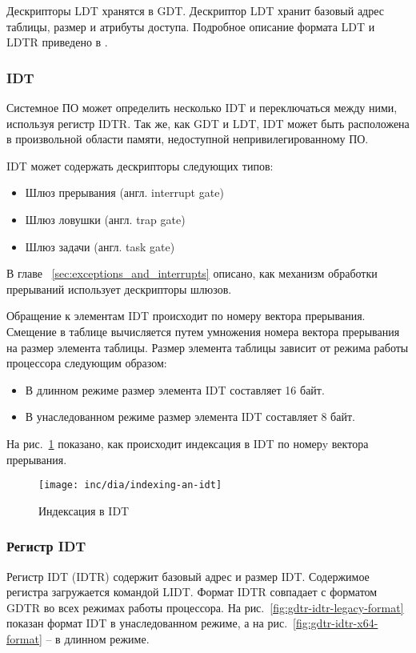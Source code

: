 Дескрипторы LDT хранятся в GDT. Дескриптор LDT хранит базовый адрес таблицы, размер и атрибуты доступа.
Подробное описание формата LDT и LDTR приведено в \cite{amd_pm_v2}.

\subsubsection*{IDT}
Системное ПО может определить несколько IDT и переключаться между ними, используя регистр IDTR. Так же, как
GDT и LDT, IDT может быть расположена в произвольной области памяти, недоступной непривилегированному ПО.

IDT может содержать дескрипторы следующих типов:
\begin{itemize}
	\item Шлюз прерывания (англ. interrupt gate)
	\item Шлюз ловушки (англ. trap gate)
	\item Шлюз задачи (англ. task gate)
\end{itemize}

В главе ~\ref{sec:exceptions_and_interrupts} описано,
как механизм обработки прерываний использует дескрипторы шлюзов.

Обращение к элементам IDT происходит по номеру вектора прерывания. Смещение в таблице вычисляется путем
умножения номера вектора прерывания на размер элемента таблицы. Размер элемента таблицы зависит от
режима работы процессора следующим образом:
\begin{itemize}
\item В длинном режиме размер элемента IDT составляет 16 байт.
\item В унаследованном режиме размер элемента IDT составляет 8 байт.
\end{itemize}

На рис.~\ref{fig:indexing-an-idt} показано, как происходит индексация в IDT по номерy вектора прерывания.

\begin{figure}[ht!]
  \centering
  \texttt{[image: inc/dia/indexing-an-idt]}
  \caption{Индексация в IDT}
  \label{fig:indexing-an-idt}
\end{figure}


\subsubsection*{Регистр IDT}
Регистр IDT (IDTR) содержит базовый адрес и размер IDT.
Содержимое регистра загружается командой LIDT. Формат IDTR совпадает с форматом GDTR во
всех режимах работы процессора. На рис.~\ref{fig:gdtr-idtr-legacy-format} показан формат
IDT в унаследованном режиме, а на рис.~\ref{fig:gdtr-idtr-x64-format} -- в длинном режиме.

